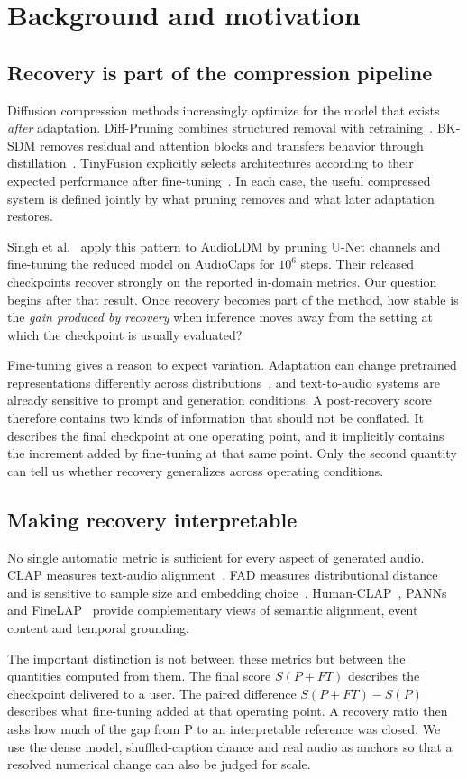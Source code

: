 \documentclass{article}
\newcommand{\PFT}{P{+}FT}
\begin{document}
\section{Background and motivation}
\subsection{Recovery is part of the compression pipeline}
Diffusion compression methods increasingly optimize for the model that exists \emph{after} adaptation. Diff-Pruning combines structured removal with retraining~\cite{fang2023diffpruning}. BK-SDM removes residual and attention blocks and transfers behavior through distillation~\cite{kim2024bksdm}. TinyFusion explicitly selects architectures according to their expected performance after fine-tuning~\cite{fang2025tinyfusion}. In each case, the useful compressed system is defined jointly by what pruning removes and what later adaptation restores.

Singh et al.~\cite{singh2026pruning} apply this pattern to AudioLDM by pruning U-Net channels and fine-tuning the reduced model on AudioCaps for $10^{6}$ steps. Their released checkpoints recover strongly on the reported in-domain metrics. Our question begins after that result. Once recovery becomes part of the method, how stable is the \emph{gain produced by recovery} when inference moves away from the setting at which the checkpoint is usually evaluated?

Fine-tuning gives a reason to expect variation. Adaptation can change pretrained representations differently across distributions~\cite{kumar2022finetuning}, and text-to-audio systems are already sensitive to prompt and generation conditions. A post-recovery score therefore contains two kinds of information that should not be conflated. It describes the final checkpoint at one operating point, and it implicitly contains the increment added by fine-tuning at that same point. Only the second quantity can tell us whether recovery generalizes across operating conditions.

\subsection{Making recovery interpretable}
No single automatic metric is sufficient for every aspect of generated audio. CLAP measures text-audio alignment~\cite{wu2023clap}. FAD measures distributional distance and is sensitive to sample size and embedding choice~\cite{kilgour2019fad,gui2024fad,chung2025kad}. Human-CLAP~\cite{takano2025humanclap}, PANNs~\cite{kong2020panns} and FineLAP~\cite{li2026finelap} provide complementary views of semantic alignment, event content and temporal grounding.

The important distinction is not between these metrics but between the quantities computed from them. The final score $S(\PFT)$ describes the checkpoint delivered to a user. The paired difference $S(\PFT)-S(P)$ describes what fine-tuning added at that operating point. A recovery ratio then asks how much of the gap from P to an interpretable reference was closed. We use the dense model, shuffled-caption chance and real audio as anchors so that a resolved numerical change can also be judged for scale.
\end{document}
